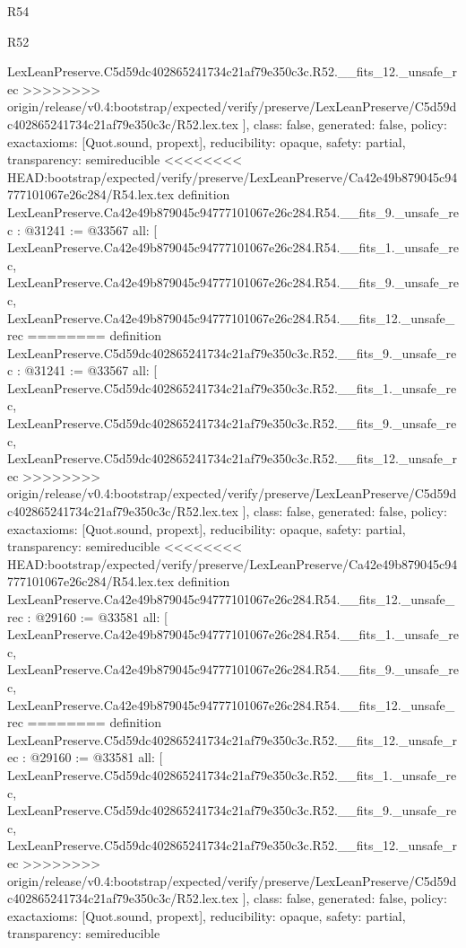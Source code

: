 \begin{lexlean}{R54}
\begin{lexlean}{R52}
\begin{coremodule}
{{{{{{{{{{{{{{{{{{{{{{{{{{{{{{{{{{{{{{{{{{{{{{{{{{{{{{{{{{{{{{{{{{{{{{{{{{{{{{{{{{{{{{{{{{{{{{{{{{{{{{{{{{{{{{{{{{{{{{{{{{{{{{{{{{{{{{{{{{{{{{{{{{{{{{{{{{{{    LexLeanPreserve.C5d59dc402865241734c21af79e350c3c.R52.__fits_12._unsafe_rec
>>>>>>>> origin/release/v0.4:bootstrap/expected/verify/preserve/LexLeanPreserve/C5d59dc402865241734c21af79e350c3c/R52.lex.tex
  ],
  class: false,
  generated: false,
  policy: exact{axioms: [Quot.sound, propext]},
  reducibility: opaque{},
  safety: partial,
  transparency: semireducible
}
<<<<<<<< HEAD:bootstrap/expected/verify/preserve/LexLeanPreserve/Ca42e49b879045c94777101067e26c284/R54.lex.tex
definition LexLeanPreserve.Ca42e49b879045c94777101067e26c284.R54.__fits_9._unsafe_rec : @31241 := @33567 {
  all: [
    LexLeanPreserve.Ca42e49b879045c94777101067e26c284.R54.__fits_1._unsafe_rec,
    LexLeanPreserve.Ca42e49b879045c94777101067e26c284.R54.__fits_9._unsafe_rec,
    LexLeanPreserve.Ca42e49b879045c94777101067e26c284.R54.__fits_12._unsafe_rec
========
definition LexLeanPreserve.C5d59dc402865241734c21af79e350c3c.R52.__fits_9._unsafe_rec : @31241 := @33567 {
  all: [
    LexLeanPreserve.C5d59dc402865241734c21af79e350c3c.R52.__fits_1._unsafe_rec,
    LexLeanPreserve.C5d59dc402865241734c21af79e350c3c.R52.__fits_9._unsafe_rec,
    LexLeanPreserve.C5d59dc402865241734c21af79e350c3c.R52.__fits_12._unsafe_rec
>>>>>>>> origin/release/v0.4:bootstrap/expected/verify/preserve/LexLeanPreserve/C5d59dc402865241734c21af79e350c3c/R52.lex.tex
  ],
  class: false,
  generated: false,
  policy: exact{axioms: [Quot.sound, propext]},
  reducibility: opaque{},
  safety: partial,
  transparency: semireducible
}
<<<<<<<< HEAD:bootstrap/expected/verify/preserve/LexLeanPreserve/Ca42e49b879045c94777101067e26c284/R54.lex.tex
definition LexLeanPreserve.Ca42e49b879045c94777101067e26c284.R54.__fits_12._unsafe_rec : @29160 := @33581 {
  all: [
    LexLeanPreserve.Ca42e49b879045c94777101067e26c284.R54.__fits_1._unsafe_rec,
    LexLeanPreserve.Ca42e49b879045c94777101067e26c284.R54.__fits_9._unsafe_rec,
    LexLeanPreserve.Ca42e49b879045c94777101067e26c284.R54.__fits_12._unsafe_rec
========
definition LexLeanPreserve.C5d59dc402865241734c21af79e350c3c.R52.__fits_12._unsafe_rec : @29160 := @33581 {
  all: [
    LexLeanPreserve.C5d59dc402865241734c21af79e350c3c.R52.__fits_1._unsafe_rec,
    LexLeanPreserve.C5d59dc402865241734c21af79e350c3c.R52.__fits_9._unsafe_rec,
    LexLeanPreserve.C5d59dc402865241734c21af79e350c3c.R52.__fits_12._unsafe_rec
>>>>>>>> origin/release/v0.4:bootstrap/expected/verify/preserve/LexLeanPreserve/C5d59dc402865241734c21af79e350c3c/R52.lex.tex
  ],
  class: false,
  generated: false,
  policy: exact{axioms: [Quot.sound, propext]},
  reducibility: opaque{},
  safety: partial,
  transparency: semireducible
}}}}}}}}}}}}}}}}}}}}}}}}}}}}}}}}}}}}}}}}}}}}}}}}}}}}}}}}}}}}}}}}}}}}}}}}}}}}}}}}}}}}}}}}}}}}}}}}}}}}}}}}}}}}}}}}}}}}}}}}}}}}}}}}}}}}}}}}}}}}}}}}}}}}}}}}}}}}}}
\end{coremodule}
\end{lexlean}
\end{lexlean}
